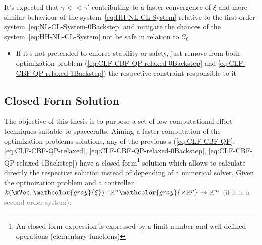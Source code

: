 It's expected that  \( \gamma << \gamma'\)  contributing to a faster convergence of \(\xi\) and more similar behaviour of the system~\ref{eq:HH-NL-CL-System} relative to the first-order system~\ref{eq:NL-CL-System-0Backstep} and mitigate the chances of the system~\ref{eq:HH-NL-CL-System} not be safe in relation to \(\mathcal{C}_0\). \\

\begin{tcolorbox}[colback=blue!5!white,colframe=blue!35!white,title=Notes:]
\begin{itemize}
    \item If it's not pretended to enforce stability or safety, just remove from both optimization problem (\ref{eq:CLF-CBF-QP-relaxed-0Backstep} and \ref{eq:CLF-CBF-QP-relaxed-1Backstep}) the respective constraint responsible to it
\end{itemize}
\end{tcolorbox} 



\subsection{Closed Form Solution}
\label{sub:closed_form}

The objective of this thesis is to purpose a set of low computational effort techniques suitable to spacecrafts. Aiming a faster computation of the optimization problems solutions, any of the previous s (\ref{eq:CLF-CBF-QP}, \ref{eq:CLF-CBF-QP-relaxed}, \ref{eq:CLF-CBF-QP-relaxed-0Backstep}, \ref{eq:CLF-CBF-QP-relaxed-1Backstep}) have a closed-form\footnote{An closed-form expression is expressed by a limit number and well defined operations (elementary functions)} solution which allows to calculate directly the respective solution instead of depending of a numerical solver. Given the  optimization problem and a controller \(k(\xVec, \mathcolor{gray}{\mathbf{\xi}}): \mathbb{R}^n \mathcolor{gray}{\times \mathbb{R}^p} \to \mathbb{R}^m\) \textcolor{gray}{(if it is a second-order system)}:


